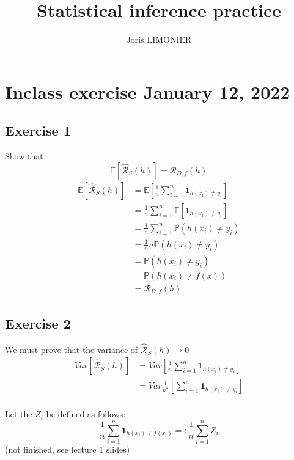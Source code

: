 \documentclass{article}
\title{Statistical inference practice}
\author{Joris LIMONIER}
\newcommand{\E}{\mathbb{E}}
\renewcommand{\P}{\mathbb{P}}
\begin{document}
\maketitle

\tableofcontents

\section{Inclass exercise January 12, 2022}
\subsection{Exercise 1}
Show that
\begin{equation}
  \E \left[ \hat{\mathcal{R}}_S (h) \right] = \mathcal{R}_{D, f} (h)
\end{equation}
\begin{align*}
  \E \left[ \hat{\mathcal{R}}_S (h) \right]
   & = \E \left[ \frac{1}{n} \sum_{i=1}^n \mathbf{1}_{h(x_i) \neq y_i} \right] \\
   & = \frac{1}{n} \sum_{i=1}^n \E \left[ \mathbf{1}_{h(x_i) \neq y_i} \right] \\
   & = \frac{1}{n} \sum_{i=1}^n \P \left(h(x_i) \neq y_i \right)               \\
   & = \frac{1}{n} n  \P \left(h(x_i) \neq y_i \right)                         \\
   & = \P \left(h(x_i) \neq y_i \right)                                        \\
   & = \P \left(h(x_i) \neq f(x) \right)                                       \\
   & = \mathcal{R}_{D, f} (h)
\end{align*}

\subsection{Exercise 2}
We must prove that the variance of \(\hat{\mathcal{R}}_S (h) \to 0\)
\begin{align*}
  Var \left[ \hat{\mathcal{R}}_S (h) \right]
   & = Var \left[ \frac{1}{n} \sum_{i=1}^n \mathbf{1}_{h(x_i) \neq y_i} \right]   \\
   & = Var \frac{1}{n^2} \left[ \sum_{i=1}^n \mathbf{1}_{h(x_i) \neq y_i} \right] \\
\end{align*}

Let the \(Z_i\) be defined as follows:
\[\frac{1}{n} \sum_{i=1}^{n} \mathbf{1}_{h(x_i) \neq f(x_i)} =: \frac{1}{n} \sum_{i=1}^{n} Z_i\]
(not finished, see lecture 1 slides)
\end{document}
